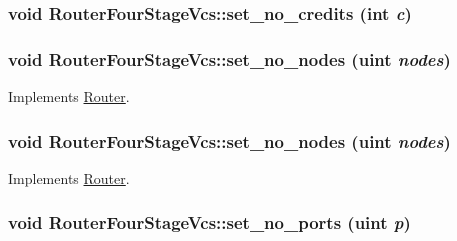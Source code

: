 \hypertarget{classRouterFourStageVcs_87998d0b2fb2c60ffdc21e20000696b0}{
\subsubsection[{set\_\-no\_\-credits}]{\setlength{\rightskip}{0pt plus 5cm}void RouterFourStageVcs::set\_\-no\_\-credits (int {\em c})}}
\label{classRouterFourStageVcs_87998d0b2fb2c60ffdc21e20000696b0}


\hypertarget{classRouterFourStageVcs_991fb1adc65124da8dc100855835a193}{
\subsubsection[{set\_\-no\_\-nodes}]{\setlength{\rightskip}{0pt plus 5cm}void RouterFourStageVcs::set\_\-no\_\-nodes ({\bf uint} {\em nodes})}}
\label{classRouterFourStageVcs_991fb1adc65124da8dc100855835a193}




Implements \hyperlink{classRouter_33073537e883e8bea1a25690bcb70049}{Router}.\hypertarget{classRouterFourStageVcs_991fb1adc65124da8dc100855835a193}{
\subsubsection[{set\_\-no\_\-nodes}]{\setlength{\rightskip}{0pt plus 5cm}void RouterFourStageVcs::set\_\-no\_\-nodes ({\bf uint} {\em nodes})}}
\label{classRouterFourStageVcs_991fb1adc65124da8dc100855835a193}




Implements \hyperlink{classRouter_33073537e883e8bea1a25690bcb70049}{Router}.\hypertarget{classRouterFourStageVcs_a8b764ec1d80fabdd6c9573f6e860149}{
\subsubsection[{set\_\-no\_\-ports}]{\setlength{\rightskip}{0pt plus 5cm}void RouterFourStageVcs::set\_\-no\_\-ports ({\bf uint} {\em p})}}
\label{classRouterFourStageVcs_a8b764ec1d80fabdd6c9573f6e860149}


